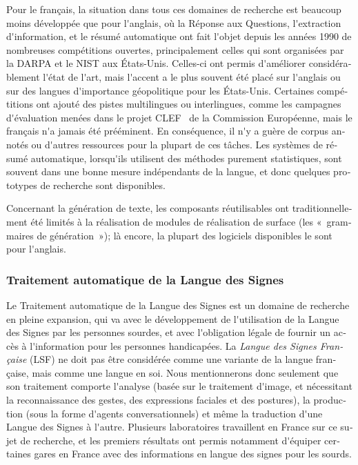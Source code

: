\documentclass[]{../metanetpaper}
\begin{document}
\begin{french}
\begin{multicols}{2}
Pour le français, la situation dans tous ces domaines de recherche est
beaucoup moins développée que pour l{\mbox '}anglais, où la Réponse aux
Questions, l{\mbox '}extraction d{\mbox '}information, et le résumé automatique ont
fait l{\mbox '}objet depuis les années 1990 de nombreuses compétitions
ouvertes, principalement celles qui sont organisées par la DARPA et le
NIST aux États-Unis. Celles-ci ont permis d{\mbox '}améliorer considérablement
l{\mbox '}état de l{\mbox '}art, mais l{\mbox '}accent a le plus souvent été placé sur
l{\mbox '}anglais ou sur des langues d{\mbox '}importance géopolitique pour les
États-Unis. Certaines compétitions ont ajouté des pistes multilingues
ou interlingues, comme les campagnes d{\mbox '}évaluation menées dans le
projet CLEF~\cite{clef} de la Commission Européenne, mais le français n{\mbox '}a jamais
été prééminent. En conséquence, il n{\mbox '}y a guère de corpus annotés ou
d{\mbox '}autres ressources pour la plupart de ces tâches. Les systèmes de
résumé automatique, lorsqu{\mbox '}ils utilisent des méthodes purement
statistiques, sont souvent dans une bonne mesure indépendants de la
langue, et donc quelques prototypes de recherche sont
disponibles. 

Concernant la génération de texte, les composants réutilisables ont
traditionnellement été limités à la réalisation de modules de
réalisation de surface (les «~grammaires de génération~»); là encore,
la plupart des logiciels disponibles le sont pour l{\mbox '}anglais.

\subsubsection{Traitement automatique de la Langue des Signes}

Le Traitement automatique de la Langue des Signes est un domaine de
recherche en pleine expansion, qui va avec le développement de
l{\mbox '}utilisation de la Langue des Signes par les personnes sourdes, et
avec l{\mbox '}obligation légale de fournir un accès à l{\mbox '}information pour les
personnes handicapées. La {\em Langue des Signes Française} (LSF) ne
doit pas être considérée comme une variante de la langue française,
mais comme une langue en soi. Nous mentionnerons donc seulement que
son traitement comporte l{\mbox '}analyse (basée sur le traitement d{\mbox '}image, et
nécessitant la reconnaissance des gestes, des expressions faciales et
des postures), la production (sous la forme d{\mbox '}agents conversationnels)
et même la traduction d{\mbox '}une Langue des Signes à l{\mbox '}autre. Plusieurs
laboratoires travaillent en France sur ce sujet de recherche, et les
premiers résultats ont permis notamment d{\mbox '}équiper certaines gares en France avec
des informations en langue des signes pour les sourds.


\end{multicols}
\end{french}
\end{document}
